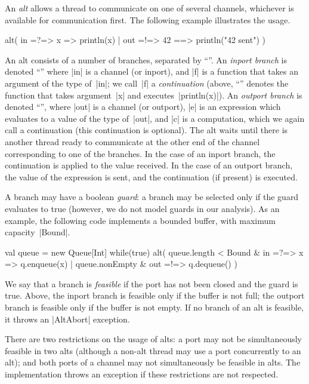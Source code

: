 An \emph{alt} allows a thread to communicate on one of several channels,
whichever is available for communication first.  The following example
illustrates the usage.
%
\begin{scala}
alt(
  in =?=> { x => println(x) }
  | out =!=> { 42 } ==> { println("42 sent") }
)
\end{scala}
%
An alt consists of a number of branches, separated by ``\SCALA{\|}''.  An
\emph{inport branch} is denoted ``'' where |in| is a channel
(or inport), and |f| is a function that takes an argument of the type of~|in|;
we call~|f| a \emph{continuation} (above, ``'' denotes
the function that takes argument~|x| and executes~|println(x)|).  An
\emph{outport branch} is denoted ``'', where |out|
is a channel (or outport), |e| is an expression which evaluates to a value of
the type of~|out|, and |c| is a computation, which we again call a
continuation (this continuation is optional).  The alt waits until there is
another thread ready to communicate at the other end of the channel
corresponding to one of the branches.  In the case of an inport branch, the
continuation is applied to the value received.  In the case of an outport
branch, the value of the expression is sent, and the continuation (if present)
is executed.

A branch may have a boolean \emph{guard}: a branch may be selected only if the
guard evaluates to true (however, we do not model guards in our analysis).  As
an example, the following code implements a bounded buffer, with maximum
capacity~|Bound|.
%
\begin{scala}
val queue = new Queue[Int]
while(true){
  alt(
    queue.length < Bound & in =?=> { x => q.enqueue(x) }
    | queue.nonEmpty & out =!=> { q.dequeue() }
  )    
}
\end{scala}
%
We say that a branch is \emph{feasible} if the port has not been closed and
the guard is true.  Above, the inport branch is feasible only if the buffer is
not full; the outport branch is feasible only if the buffer is not empty.  If
no branch of an alt is feasible, it throws an |AltAbort| exception. 

There are two restrictions on the usage of alts: a port may not be
simultaneously feasible in two alts (although a non-alt thread may use a port
concurrently to an alt); and both ports of a channel may not simultaneously be
feasible in alts.  The implementation throws an exception if these
restrictions are not respected. 

